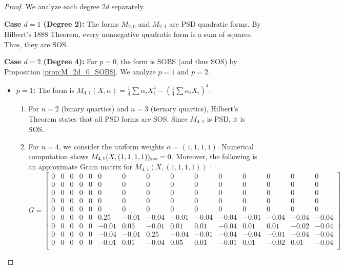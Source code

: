 \documentclass{article}
\begin{document}
\begin{proof}
We analyze each degree $2d$ separately.

\noindent \textbf{Case $d=1$ (Degree 2):}
The forms $M_{2,0}$ and $M_{2,1}$ are PSD quadratic forms. By Hilbert's 1888 Theorem, every nonnegative quadratic 
form is a sum of squares. Thus, they are SOS.

\noindent \textbf{Case $d=2$ (Degree 4):}
For $p=0$, the form is SOBS (and thus SOS) by Proposition \ref{prop:M_2d_0_SOBS}. We analyze $p=1$ and $p=2$.
\begin{itemize}
    \item \textbf{$p=1$:} The form is $M_{4,1}(X, \alpha) = \frac{1}{4}\sum \alpha_i X_i^4 - (\frac{1}{4}\sum \alpha_i X_i)^4$.
    \begin{enumerate}
        \item For $n=2$ (binary quartics) and $n=3$ (ternary quartics), Hilbert's Theorem states that all PSD forms are SOS. 
        Since $M_{4,1}$ is PSD, it is SOS.
        \item For $n=4$, we consider the uniform weights $\alpha = (1,1,1,1)$. 
                 Numerical computation shows $M_{4,1}(X, (1,1,1,1))_{\rm sos}=0$. 
                 Moreover, the following is an approximate Gram matrix for $M_{4,1}(X, (1,1,1,1))$ \cite{GMIr}:
         {\scriptsize
         \setlength\arraycolsep{1.5pt}
         \[
            G = \begin{bmatrix}
            0 & 0 & 0 & 0 & 0 & 0 & 0 & 0 & 0 & 0 & 0 & 0 & 0 & 0 & 0 \\
            0 & 0 & 0 & 0 & 0 & 0 & 0 & 0 & 0 & 0 & 0 & 0 & 0 & 0 & 0 \\
            0 & 0 & 0 & 0 & 0 & 0 & 0 & 0 & 0 & 0 & 0 & 0 & 0 & 0 & 0 \\
            0 & 0 & 0 & 0 & 0 & 0 & 0 & 0 & 0 & 0 & 0 & 0 & 0 & 0 & 0 \\
            0 & 0 & 0 & 0 & 0 & 0 & 0 & 0 & 0 & 0 & 0 & 0 & 0 & 0 & 0 \\
            0 & 0 & 0 & 0 & 0 & 0.25 & -0.01 & -0.04 & -0.01 & -0.04 & -0.04 & -0.01 & -0.04 & -0.04 & -0.04 \\
            0 & 0 & 0 & 0 & 0 & -0.01 & 0.05 & -0.01 & 0.01 & 0.01 & -0.04 & 0.01 & 0.01 & -0.02 & -0.04 \\
            0 & 0 & 0 & 0 & 0 & -0.04 & -0.01 & 0.25 & -0.04 & -0.01 & -0.04 & -0.04 & -0.01 & -0.04 & -0.04 \\
            0 & 0 & 0 & 0 & 0 & -0.01 & 0.01 & -0.04 & 0.05 & 0.01 & -0.01 & 0.01 & -0.02 & 0.01 & -0.04 \\

\end{bmatrix}\]}
\end{enumerate}
\end{itemize}
\end{proof}
\end{document}
